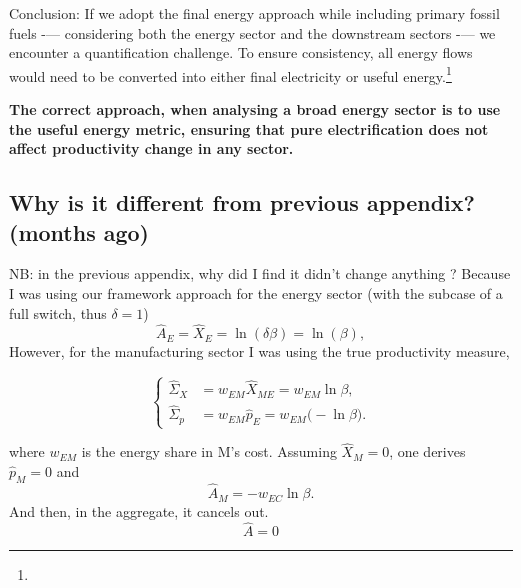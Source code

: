 \documentclass[11pt]{article}
\begin{document}
Conclusion: If we adopt the final energy approach while including primary fossil fuels -— considering both the energy sector and the downstream sectors -— we encounter a quantification challenge. To ensure consistency, all energy flows would need to be converted into either final electricity or useful energy.\footnote{
}

\textbf{The correct approach, when analysing a broad energy sector is to use the useful energy metric, ensuring that pure electrification does not affect productivity change in any sector.}



\subsection{Why is it different from previous appendix? (months ago)}

NB: in the previous appendix, why did I find it didn't change anything ? Because I was using our framework approach for the energy sector (with the subcase of a full switch, thus $\delta=1$) 
\[ \hat{A}_E=\hat{X}_E=\ln(\delta \beta )=\ln(\beta ),\]
However, for the manufacturing sector I was using the true productivity measure, 

  \begin{equation*}
    \left\{
    \begin{aligned}
        \hat{\Sigma}_X &= w_{EM}\hat{X}_{ME} 
                      = w_{EM}\ln \beta , \\
        \hat{\Sigma}_p &= w_{EM}\hat{p}_E
                      = w_{EM}\bigl(-\ln \beta \bigr).
    \end{aligned}
    \right.
\end{equation*}

where $w_{EM}$ is the energy share in M's cost.  Assuming $\hat{X}_M = 0$, one derives $\hat{p}_M = 0$ and
\begin{equation*}
    \hat{A}_M = -w_{EC}\ln \beta .
\end{equation*}
And then, in the aggregate, it cancels out. 
\[\hat{A}=0\]
\end{document}
